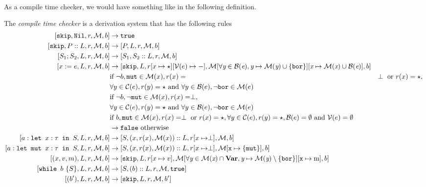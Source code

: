 As a compile time checker, we would have something like in the following definition. 
\begin{definition}
\label{compiletimecheckerwhile}
The \emph{compile time checker} is a derivation system that has the following rules
\begin{align*}
\ccwhile{\texttt{skip}}{\texttt{Nil}}{r}{M}{b} & \to \texttt{true}  \\
\ccwhile{\texttt{skip}}{P::L}{r}{M}{b}      & \to \ccwhile{P}{L}{r}{M}{b}  \\
\ccwhile{S_1; S_2}{L}{r}{M}{b}                 & \to \ccwhile{S_1}{S_2::L}{r}{M}{b}  \\
\ccwhile{x:=e}{L}{r}{M}{b}                    & \to \ccwhile{\texttt{skip}}{L}{r[x\mapsto \star][\mathcal{V}(e) \mapsto -]}{M[\forall \textit{y} \in B(\textit{e}), \textit{y}\mapsto M(\textit{y})\cup \{\texttt{bor} \} ][\textit{x} \mapsto M(\textit{x}) \cup B(\textit{e})]}{b} \\
                                    & \textrm{if } \neg b, \texttt{mut} \in \mathcal{M}(x), r(x) = & \perp \textrm{ or } r(x) = \star, \\ &  \forall y \in \mathcal{C}(e), r(y) = \star \textrm{ and } \forall y \in \mathcal{B}(e), \neg \texttt{bor} \in \mathcal{M}(e) \\
                                    & \textrm{if } \neg b, \neg \texttt{mut} \in \mathcal{M}(x),  r(x) = \perp,  \\ & \forall y \in \mathcal{C}(e), r(y) = \star \textrm{ and } \forall y \in \mathcal{B}(e), \neg \texttt{bor} \in \mathcal{M}(e) \\
                                    & \textrm{if } b, \texttt{mut} \in \mathcal{M}(x), r(x) = \perp \textrm{ or } r(x) = \star, \forall y \in \mathcal{C}(e), r(y) = \star, \mathcal{B}(e) = \emptyset \textrm{ and } \mathcal{V}(e) = \emptyset \\
                                    & \to \texttt{false} \textrm{ otherwise}\\
\ccwhile{\letm{x}{S}}{L}{r}{M}{b} & \to \ccwhile{S}{(x,r(x),\mathcal{M}(x))::L}{r[x\mapsto \perp]}{M}{b} \\
\ccwhile{\letmut{x}{S}}{L}{r}{M}{b} & \to \ccwhile{S}{(x,r(x),\mathcal{M}(x))::L}{r[x\mapsto \perp]}{M[\texttt{x}\mapsto\{\texttt{mut}\}]}{b} \\
\ccwhile{(x,v,m)}{L}{r}{M}{b}                    & \to \ccwhile{\texttt{skip}}{L}{r[x \mapsto v]}{M[\forall \textit{y} \in M(\textit{x})\cap\textbf{Var}, \textit{y} \mapsto M(\textit{y}) \setminus \{\texttt{bor}\}][\texttt{x} \mapsto \textrm{m}]}{b} \\
\ccwhile{\whi{S}}{L}{r}{M}{b} & \to \ccwhile{S}{(b)::L}{r}{M}{\texttt{true}} \\
\ccwhile{(b')}{L}{r}{M}{b} & \to \ccwhile{\texttt{skip}}{L}{r}{M}{b'}
\end{align*}
\end{definition}
